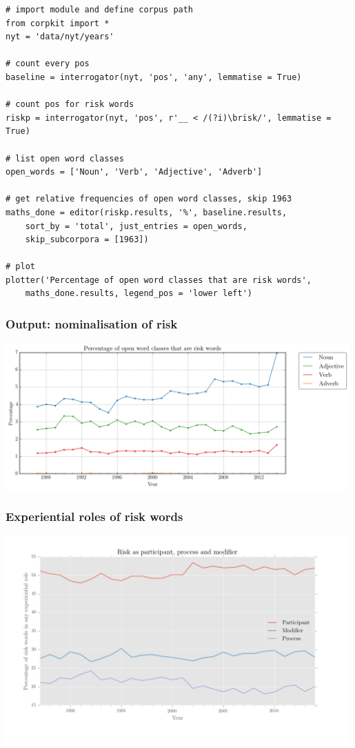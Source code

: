 \documentclass{beamer}       %
\begin{document}
\begin{frame}[fragile]
    \begin{verbatim}
# import module and define corpus path
from corpkit import *
nyt = 'data/nyt/years'

# count every pos
baseline = interrogator(nyt, 'pos', 'any', lemmatise = True)

# count pos for risk words
riskp = interrogator(nyt, 'pos', r'__ < /(?i)\brisk/', lemmatise = True)

# list open word classes
open_words = ['Noun', 'Verb', 'Adjective', 'Adverb']

# get relative frequencies of open word classes, skip 1963
maths_done = editor(riskp.results, '%', baseline.results, 
    sort_by = 'total', just_entries = open_words, 
    skip_subcorpora = [1963])

# plot
plotter('Percentage of open word classes that are risk words', 
    maths_done.results, legend_pos = 'lower left')
    \end{verbatim}
\end{frame}

\begin{frame}
    \frametitle{Output: nominalisation of risk}
    \centering
    \includegraphics[width=0.99\textwidth]{../images/percentage-of-open-word-classes-that-are-risk-words}
\end{frame}

\begin{frame}
    \frametitle{Experiential roles of risk words}
    \centering
    \includegraphics[width=0.99\textwidth]{../images/ppm_final_colour}
\end{frame}
\end{document}
